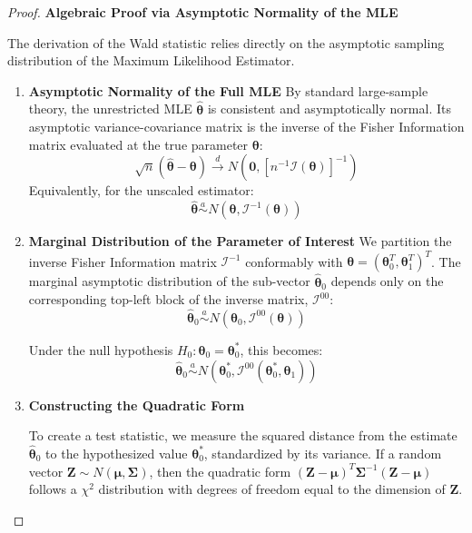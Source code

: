 \documentclass[
  letterpaper,
  DIV=11,
  numbers=noendperiod]{scrreprt}
\renewcommand{\[}{\begin{equation}}
\renewcommand{\]}{\end{equation}}
\theoremstyle{definition}
\theoremstyle{plain}
\theoremstyle{plain}
\theoremstyle{plain}
\theoremstyle{definition}
\theoremstyle{plain}
\theoremstyle{remark}
\begin{document}
\begin{proof}
\textbf{Algebraic Proof via Asymptotic Normality of the MLE}

The derivation of the Wald statistic relies directly on the asymptotic
sampling distribution of the Maximum Likelihood Estimator.

\begin{enumerate}
\def\labelenumi{\arabic{enumi}.}
\item
  \textbf{Asymptotic Normality of the Full MLE} By standard large-sample
  theory, the unrestricted MLE \(\hat{\boldsymbol{\theta}}\) is
  consistent and asymptotically normal. Its asymptotic
  variance-covariance matrix is the inverse of the Fisher Information
  matrix evaluated at the true parameter \(\boldsymbol{\theta}\):
  \[\sqrt{n}(\hat{\boldsymbol{\theta}} - \boldsymbol{\theta}) \xrightarrow{d} N(\mathbf{0}, [n^{-1}\mathcal{I}(\boldsymbol{\theta})]^{-1})\]
  Equivalently, for the unscaled estimator:
  \[\hat{\boldsymbol{\theta}} \overset{a}{\sim} N(\boldsymbol{\theta}, \mathcal{I}^{-1}(\boldsymbol{\theta}))\]
\item
  \textbf{Marginal Distribution of the Parameter of Interest} We
  partition the inverse Fisher Information matrix \(\mathcal{I}^{-1}\)
  conformably with
  \(\boldsymbol{\theta} = (\boldsymbol{\theta}_0^T, \boldsymbol{\theta}_1^T)^T\).
  The marginal asymptotic distribution of the sub-vector
  \(\hat{\boldsymbol{\theta}}_0\) depends only on the corresponding
  top-left block of the inverse matrix, \(\mathcal{I}^{00}\):
  \[\hat{\boldsymbol{\theta}}_0 \overset{a}{\sim} N(\boldsymbol{\theta}_0, \mathcal{I}^{00}(\boldsymbol{\theta}))\]

  Under the null hypothesis
  \(H_0: \boldsymbol{\theta}_0 = \boldsymbol{\theta}_0^*\), this
  becomes:
  \[\hat{\boldsymbol{\theta}}_0 \overset{a}{\sim} N(\boldsymbol{\theta}_0^*, \mathcal{I}^{00}(\boldsymbol{\theta}_0^*, \boldsymbol{\theta}_1))\]
\item
  \textbf{Constructing the Quadratic Form}

  To create a test statistic, we measure the squared distance from the
  estimate \(\hat{\boldsymbol{\theta}}_0\) to the hypothesized value
  \(\boldsymbol{\theta}_0^*\), standardized by its variance. If a random
  vector \(\mathbf{Z} \sim N(\boldsymbol{\mu}, \mathbf{\Sigma})\), then
  the quadratic form
  \((\mathbf{Z} - \boldsymbol{\mu})^T \mathbf{\Sigma}^{-1} (\mathbf{Z} - \boldsymbol{\mu})\)
  follows a \(\chi^2\) distribution with degrees of freedom equal to the
  dimension of \(\mathbf{Z}\).


\end{enumerate}
\end{proof}
\end{document}
